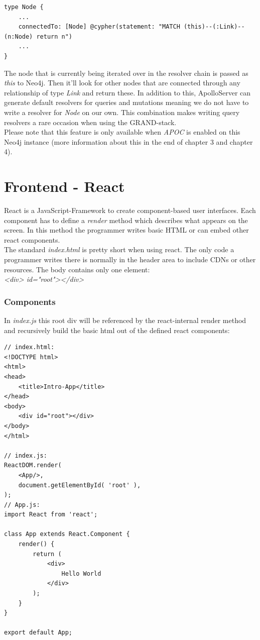 \begin{lstlisting}[caption={Cypher in GraphQL}]
type Node { 
	... 
	connectedTo: [Node] @cypher(statement: "MATCH (this)--(:Link)--(n:Node) return n") 
	...
}
\end{lstlisting}

The node that is currently being iterated over in the resolver chain is passed as \emph{this} to Neo4j. Then it'll look for other nodes that are connected through any relationship of type \emph{Link} and return these. In addition to this, ApolloServer can generate default resolvers for queries and mutations meaning we do not have to write a resolver for \emph{Node} on our own. This combination makes writing query resolvers a rare occasion when using the GRAND-stack. \\

Please note that this feature is only available when \emph{APOC} is enabled on this Neo4j instance (more information about this in the end of chapter 3 and chapter 4).

\section{Frontend - React}
React is a JavaScript-Framework to create component-based user interfaces. Each component has to define a \emph{render} method which describes what appears on the screen. In this method the programmer writes basic HTML or can embed other react components. \\
The standard \emph{index.html} is pretty short when using react. The only code a programmer writes there is normally in the header area to include CDNs or other resources. The body contains only one element: \\
\emph{<div> id="root"></div>} 

\subsubsection{Components}
In \emph{index.js} this root div will be referenced by the react-internal render method and recursively build the basic html out of the defined react components:

\begin{lstlisting}[caption={Hello World in React},label={ex251}]
// index.html:
<!DOCTYPE html>
<html>
<head>
	<title>Intro-App</title>
</head>
<body>
	<div id="root"></div>
</body>
</html>

// index.js:
ReactDOM.render(
	<App/>,
	document.getElementById( 'root' ),
);
// App.js:
import React from 'react';

class App extends React.Component {
	render() {
		return (
			<div>
				Hello World
			</div>
		);
	}
}

export default App;
\end{lstlisting}


